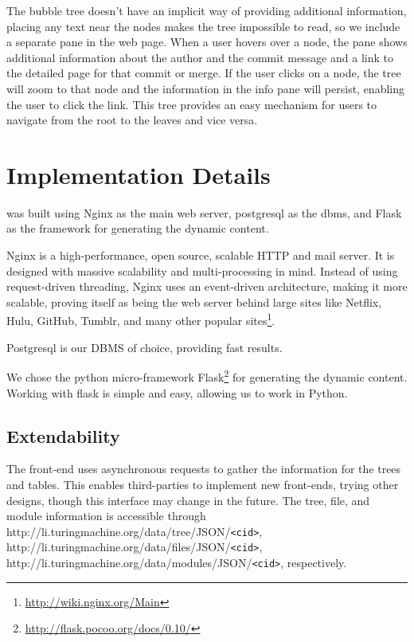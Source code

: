\documentclass[conference, draftclsnofoot, draft]{IEEEtran}
\begin{document}
The bubble tree doesn't have an implicit way of providing additional information,
placing any text near the nodes makes the tree impossible to read, so we include a
separate pane in the web page. When a user hovers over a node, the pane shows
additional information about the author and the commit message and a link to the
detailed page for that commit or merge. If the user clicks on a node, the tree will
zoom to that node and the information in the info pane will persist, enabling the
user to click the link. This tree provides an easy mechanism for users to navigate
from the root to the leaves and vice versa.

\section{Implementation Details}

\tool was built using Nginx as the main web server, postgresql as the dbms, and Flask as the framework for generating the dynamic content.

Nginx is a high-performance, open source, scalable HTTP and mail server. It is designed with massive
scalability and multi-processing in mind. Instead of using request-driven threading,
Nginx uses an event-driven architecture, making it more scalable, proving itself as
being the web server behind large sites like Netflix, Hulu, GitHub, Tumblr, and many
other popular sites\footnote{\url{http://wiki.nginx.org/Main}}.

Postgresql is our DBMS of choice, providing fast results.

We chose the python micro-framework
Flask\footnote{\url{http://flask.pocoo.org/docs/0.10/}} for generating the dynamic
content. Working with flask is simple and easy, allowing us to work in Python.

\subsection{Extendability}

The front-end uses asynchronous requests to gather the information for the trees and
tables. This enables third-parties to implement new front-ends, trying other
designs, though this interface may change in the future. The tree, file, and module
information is accessible through
http://li.turingmachine.org/data/tree/JSON/\verb|<cid>|,
http://li.turingmachine.org/data/files/JSON/\verb|<cid>|,
http://li.turingmachine.org/data/modules/JSON/\verb|<cid>|, respectively.
\end{document}
